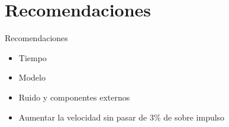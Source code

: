 \documentclass[mathserif,spanish]{beamer}
\begin{document}
    \section{Recomendaciones}    %
        \begin{frame}{Recomendaciones}
        \begin{itemize}
            \item Tiempo
            \item Modelo
            \item Ruido y componentes externos
            \item Aumentar la velocidad sin pasar de 3$\%$ de sobre impulso 
        \end{itemize}
        \end{frame}
\end{document}

